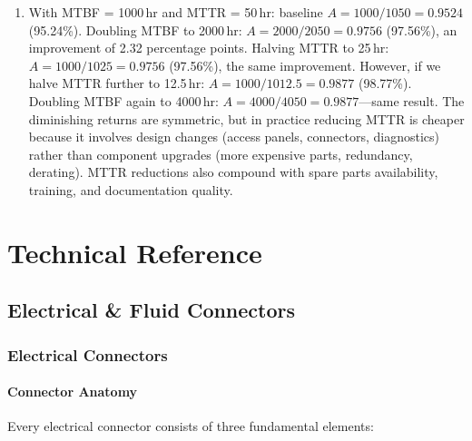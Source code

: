 \documentclass[11pt,letterpaper,twoside,openany]{book}
\begin{document}
\begin{enumerate}[leftmargin=1.5em]
\item With MTBF = 1000\,hr and MTTR = 50\,hr: baseline $A = 1000/1050 = 0.9524$ (95.24\%). Doubling MTBF to 2000\,hr: $A = 2000/2050 = 0.9756$ (97.56\%), an improvement of 2.32 percentage points. Halving MTTR to 25\,hr: $A = 1000/1025 = 0.9756$ (97.56\%), the same improvement. However, if we halve MTTR further to 12.5\,hr: $A = 1000/1012.5 = 0.9877$ (98.77\%). Doubling MTBF again to 4000\,hr: $A = 4000/4050 = 0.9877$---same result. The diminishing returns are symmetric, but in practice reducing MTTR is cheaper because it involves design changes (access panels, connectors, diagnostics) rather than component upgrades (more expensive parts, redundancy, derating). MTTR reductions also compound with spare parts availability, training, and documentation quality.
\end{enumerate}


\part{Technical Reference}

\FloatBarrier
\chapter{Electrical \& Fluid Connectors}



\vspace{1em}




\vspace{1em}

\FloatBarrier
\section{Electrical Connectors}

\subsection{Connector Anatomy}

Every electrical connector consists of three fundamental elements:
\end{document}
